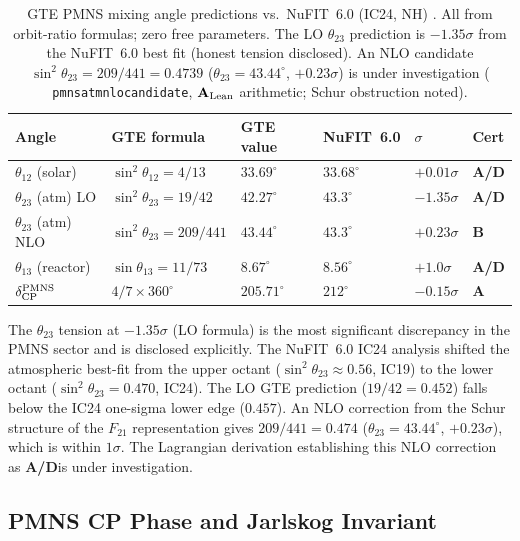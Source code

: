 \documentclass[11pt,openany]{book}
\theoremstyle{remark}
\newcommand{\lean}[1]{%
  \penalty-100
  \begingroup\def\_{\textunderscore\allowbreak}\texttt{#1}\endgroup}
\newcommand{\CatA}{\textbf{A}}
\newcommand{\CatAL}{\ensuremath{\textbf{A}_{\rm Lean}}}
\newcommand{\CatAD}{\textbf{A/D}}
\newcommand{\CatB}{\textbf{B}}
\begin{document}
\begin{table}[htbp]
\centering
\caption{GTE PMNS mixing angle predictions vs.\ NuFIT~6.0 (IC24, NH) \cite{NuFIT60}.
All from orbit-ratio formulas; zero free parameters.  The LO $\theta_{23}$ prediction
is $-1.35\sigma$ from the NuFIT~6.0 best fit (honest tension disclosed).
An NLO candidate $\sin^2\theta_{23} = 209/441 = 0.4739$ ($\theta_{23}=43.44^\circ$,
$+0.23\sigma$) is under investigation (\lean{pmns\_atm\_nlo\_candidate}, \CatAL
arithmetic; Schur obstruction noted).}
\label{tab:pmns}
\setlength{\tabcolsep}{5pt}
\begin{tabular}{llllll}
\toprule
Angle & GTE formula & GTE value & NuFIT~6.0 & $\sigma$ & Cert \\
\midrule
$\theta_{12}$ (solar) & $\sin^2\theta_{12}=4/13$ & $33.69^\circ$ & $33.68^\circ$ & $+0.01\sigma$ & \CatAD \\
$\theta_{23}$ (atm) LO & $\sin^2\theta_{23}=19/42$ & $42.27^\circ$ & $43.3^\circ$ & $-1.35\sigma$ & \CatAD \\
$\theta_{23}$ (atm) NLO & $\sin^2\theta_{23}=209/441$ & $43.44^\circ$ & $43.3^\circ$ & $+0.23\sigma$ & \CatB \\
$\theta_{13}$ (reactor) & $\sin\theta_{13}=11/73$ & $8.67^\circ$ & $8.56^\circ$ & $+1.0\sigma$ & \CatAD \\
$\delta_{\rm CP}^{\rm PMNS}$ & $4/7\times360^\circ$ & $205.71^\circ$ & $212^\circ$ & $-0.15\sigma$ & \CatA \\
\bottomrule
\end{tabular}
\end{table}

The $\theta_{23}$ tension at $-1.35\sigma$ (LO formula) is the most significant
discrepancy in the PMNS sector and is disclosed explicitly.  The NuFIT~6.0 IC24
analysis shifted the atmospheric best-fit from the upper octant ($\sin^2\theta_{23}
\approx 0.56$, IC19) to the lower octant ($\sin^2\theta_{23} = 0.470$, IC24).
The LO GTE prediction ($19/42 = 0.452$) falls below the IC24 one-sigma lower
edge ($0.457$).  An NLO correction from the Schur structure of the $F_{21}$
representation gives $209/441 = 0.474$ ($\theta_{23} = 43.44^\circ$, $+0.23\sigma$),
which is within $1\sigma$.  The Lagrangian derivation establishing this NLO
correction as \CatAD is under investigation.

\subsection*{PMNS CP Phase and Jarlskog Invariant}
\end{document}
